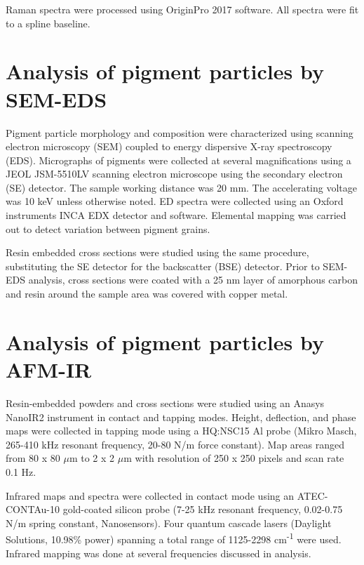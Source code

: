 Raman spectra were processed using OriginPro 2017 software. All spectra were fit to a spline baseline. 

\section[Analysis of pigment particles by SEM-EDS]{Analysis of pigment particles by SEM-EDS}
\label{section2.3}

Pigment particle morphology and composition were characterized using scanning electron microscopy (SEM) coupled to energy dispersive X-ray spectroscopy (EDS). Micrographs of pigments were collected at several magnifications using a JEOL JSM-5510LV scanning electron microscope using the secondary electron (SE) detector. The sample working distance was 20 mm. The accelerating voltage was 10 keV unless otherwise noted. ED spectra were collected using an Oxford instruments INCA EDX detector and software. Elemental mapping was carried out to detect variation between pigment grains.

Resin embedded cross sections were studied using the same procedure, substituting the SE detector for the backscatter (BSE) detector. Prior to SEM-EDS analysis, cross sections were coated with a 25 nm layer of amorphous carbon and resin around the sample area was covered with copper metal.

\section[Analysis of pigment particles by AFM-IR]{Analysis of pigment particles by AFM-IR}
\label{section2.4}

Resin-embedded powders and cross sections were studied using an Anasys NanoIR2 instrument in contact and tapping modes. Height, deflection, and phase maps were collected in tapping mode using a HQ:NSC15 Al probe (Mikro Masch, 265-410 kHz resonant frequency, 20-80 N/m force constant). Map areas ranged from 80 x 80 $\mu$m to 2 x 2 $\mu$m with resolution of 250 x 250 pixels and scan rate 0.1 Hz. 

Infrared maps and spectra were collected in contact mode using an ATEC-CONTAu-10 gold-coated silicon probe (7-25 kHz resonant frequency, 0.02-0.75 N/m spring constant, Nanosensors). Four quantum cascade lasers (Daylight Solutions, 10.98\% power) spanning a total range of 1125-2298 cm\textsuperscript{-1} were used. Infrared mapping was done at several frequencies discussed in analysis.


